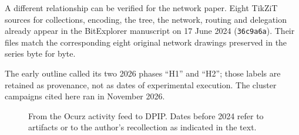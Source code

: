\documentclass[11pt]{article}
\begin{document}
A different relationship can be verified for the network paper. Eight TikZiT sources for collections, encoding, the tree, the network, routing and delegation already appear in the BitExplorer manuscript on 17 June 2024 (\texttt{36c9a6a}). Their files match the corresponding eight original network drawings preserved in the series byte for byte.

The early outline called its two 2026 phases ``H1'' and ``H2''; those labels are retained as provenance, not as dates of experimental execution. The cluster campaigns cited here ran in November 2026.

\begin{figure}[H]
    \centering
    \caption{From the Ocurz activity feed to DPIP. Dates before 2024 refer to artifacts or to the author's recollection as indicated in the text.}
\end{figure}
\end{document}

